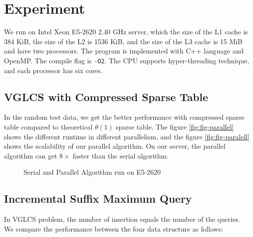 \section{Experiment}
\label{sec:Experiment}

We run on Intel Xeon E5-2620 2.40 GHz server, which the size of the L1
cache is 384 KiB, the size of the L2 is 1536 KiB, and the size of the
L3 cache is 15 MiB and have two processors.  The program is
implemented with C++ language and OpenMP. The compile flag is
\texttt{-O2}.  The CPU supports hyper-threading technique, and each
processor has six cores.

\subsection{VGLCS with Compressed Sparse Table}

In the random test data, we get the better performance with compressed
sparse table compared to theoretical $\theta(1)$ sparse table.  The
figure \ref{fig:fig-parallel} shows the different runtime in different
parallelism, and the figure \ref{fig:fig-paralell} shows the
scalability of our parallel algorithm.  On our server, the parallel
algorithm can get $8 \times$ faster than the serial algorithm.

\begin{figure}[!thb]
  \centering
  \caption{Serial and Parallel Algorithm run on E5-2620}
\end{figure}



\subsection{Incremental Suffix Maximum Query}

In VGLCS problem, the number of insertion equals the number of the
queries. We compare the performance between the four data structure as
follows:

